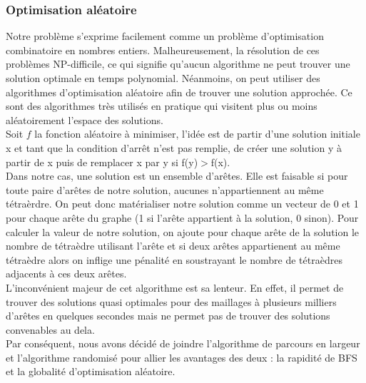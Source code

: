 \documentclass[a4paper,11pt,openany]{article}
\begin{document}
\subsubsection{Optimisation aléatoire}
\noindent
Notre problème s'exprime facilement comme un problème d'optimisation combinatoire en nombres entiers. Malheureusement, la résolution de ces problèmes NP-difficile, ce qui signifie qu'aucun algorithme ne peut trouver une solution optimale en temps polynomial. Néanmoins, on peut utiliser des algorithmes d'optimisation aléatoire afin de trouver une solution approchée. Ce sont des algorithmes très utilisés en pratique qui visitent plus ou moins aléatoirement l'espace des solutions.\\
Soit $f$ la fonction aléatoire à minimiser, l'idée est de partir d'une solution initiale x et tant que la condition d'arrêt n'est pas remplie, de créer une solution y à partir de x puis de remplacer x par y si f(y)$>$f(x).\\
Dans notre cas, une solution est un ensemble d'arêtes. Elle est faisable si pour toute paire d'arêtes de notre solution, aucunes n'appartiennent au même tétraèrdre. On peut donc matérialiser notre solution comme un vecteur de 0 et 1 pour chaque arête du graphe (1 si l'arête appartient à la solution, 0 sinon). Pour calculer la valeur de notre solution, on ajoute pour chaque arête de la solution le nombre de tétraèdre utilisant l'arête et si deux arêtes appartienent au même tétraèdre alors on inflige une pénalité en soustrayant le nombre de tétraèdres adjacents à ces deux arêtes.\\
L'inconvénient majeur de cet algorithme est sa lenteur. En effet, il permet de trouver des solutions quasi optimales pour des maillages à plusieurs milliers d'arêtes en quelques secondes mais ne permet pas de trouver des solutions convenables au dela.\\
Par conséquent, nous avons décidé de joindre l'algorithme de parcours en largeur et l'algorithme randomisé pour allier les avantages des deux : la rapidité de BFS et la globalité d'optimisation aléatoire.
\end{document}

